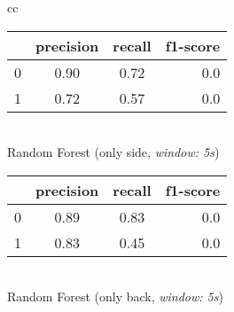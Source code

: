 \begin{table}
\begin{tabular}{cc}    
    \begin{minipage}{.33\linewidth}
        \begin{center}
            \begin{tabular}{ | l | c | c | r | }
              \hline
               & precision & recall & f1-score \\ \hline
              0 & 0.90 & 0.72 & 0.0 \\ \hline
              1 & 0.72 & 0.57 & 0.0 \\
              \hline
            \end{tabular}
            \smallskip
            \\ Random Forest (only side, \textit{window: 5s})
        \end{center}
    \end{minipage}

    \begin{minipage}{.33\linewidth}
        \begin{center}
            \begin{tabular}{ | l | c | c | r | }
              \hline
               & precision & recall & f1-score \\ \hline
              0 & 0.89 & 0.83 & 0.0 \\ \hline
              1 & 0.83 & 0.45 & 0.0 \\
              \hline
            \end{tabular}
            \smallskip
            \\ Random Forest (only back, \textit{window: 5s})
        \end{center}
    \end{minipage}


\end{tabular}
\end{table}
